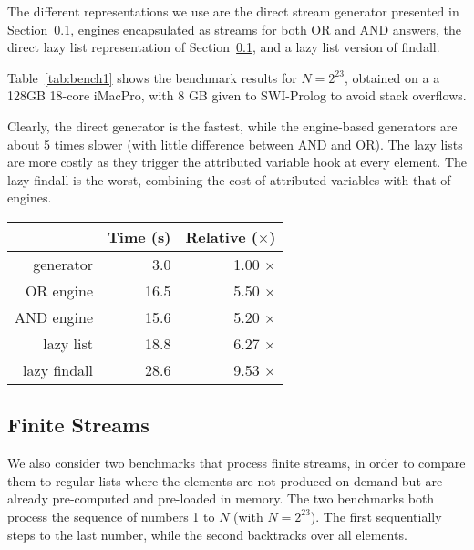 \documentclass{new_tlp}
\begin{document}
The different representations we use are the direct stream generator
presented in Section~\ref{}, engines encapsulated as streams for both OR
and AND answers, the direct lazy list representation of Section~\ref{}, and
a lazy list version of findall.

Table~\ref{tab:bench1} shows the benchmark results for $N = 2^{23}$, obtained on a a
128GB 18-core iMacPro, with 8 GB given to SWI-Prolog to avoid stack overflows.

Clearly, the direct generator is the fastest, while the engine-based generators
are about 5 times slower (with little difference between AND and OR). The lazy
lists are more costly as they trigger the attributed variable hook at every
element. The lazy findall is the worst, combining the cost of attributed
variables with that of engines.

\renewcommand{\arraystretch}{1.2} 
\newcommand{\ra}[1]{\renewcommand{\arraystretch}{#1}}

\begin{table*}\centering
\ra{1.3}
\begin{tabular}{@{}rrr@{}}
\toprule
& Time (s) & Relative ($\times$) \\
\midrule
generator    &   3.0 &  1.00 $\times$  \\ 
OR engine    &  16.5 &  5.50 $\times$  \\
AND engine   &  15.6 &  5.20 $\times$  \\
lazy list    &  18.8 &  6.27 $\times$  \\
lazy findall &  28.6 &  9.53 $\times$  \\
\bottomrule
\end{tabular}
\caption{Benchmark results for accessing the $2^{23}$th element in an infinite stream.}\label{tab:bench1}
\end{table*}

\subsection{Finite Streams}

We also consider two benchmarks that process finite streams, in order to compare them to regular
lists where the elements are not produced on demand but are already pre-computed and pre-loaded
in memory. The two benchmarks both process the sequence of numbers 1 to $N$ (with $N=2^{23}$). 
The first sequentially steps to the last number, while the second backtracks over all elements.
\end{document}

